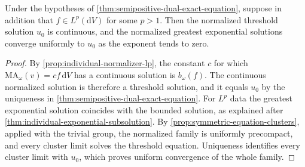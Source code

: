 \begin{corollary}\label{cor:semipositive-dual-lp-limit}
Under the hypotheses of \cref{thm:semipositive-dual-exact-equation}, suppose in addition that $f\in L^p(\mathrm{d}V)$ for some $p>1$. Then the normalized threshold solution $u_0$ is continuous, and the normalized greatest exponential solutions converge uniformly to $u_0$ as the exponent tends to zero.
\end{corollary}
\begin{proof}
By \cref{prop:individual-normalizer-lp}, the constant $c$ for which $\mathrm{MA}_\omega(v)=cf\,\mathrm{d}V$ has a continuous solution is $b_\omega(f)$. The continuous normalized solution is therefore a threshold solution, and it equals $u_0$ by the uniqueness in \cref{thm:semipositive-dual-exact-equation}. For $L^p$ data the greatest exponential solution coincides with the bounded solution, as explained after \cref{thm:individual-exponential-subsolution}. By \cref{prop:symmetric-equation-clusters}, applied with the trivial group, the normalized family is uniformly precompact, and every cluster limit solves the threshold equation. Uniqueness identifies every cluster limit with $u_0$, which proves uniform convergence of the whole family.
\end{proof}
